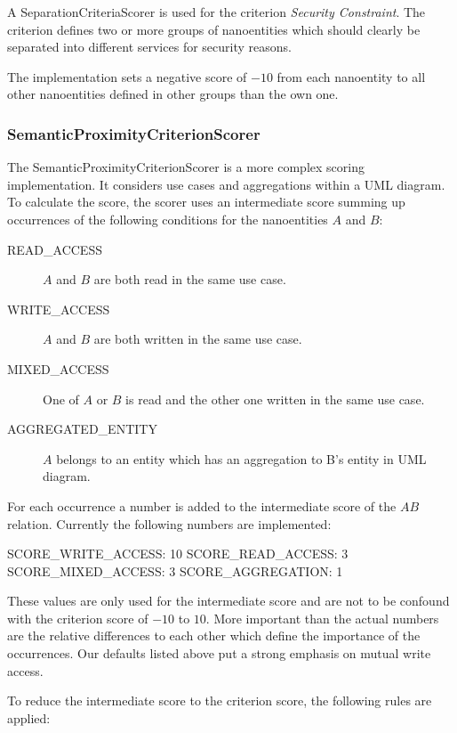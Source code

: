 A SeparationCriteriaScorer is used for the criterion \textit{Security Constraint}. The criterion defines two or more groups of nanoentities which should clearly be separated into different services for security reasons. 

The implementation sets a negative score of $-10$ from each nanoentity to all other nanoentities defined in other groups than the own one. 

\subsubsection{SemanticProximityCriterionScorer}

The SemanticProximityCriterionScorer is a more complex scoring implementation. It considers use cases and aggregations within a UML diagram. To calculate the score, the scorer uses an intermediate score summing up occurrences of the following conditions for the nanoentities $A$ and $B$:

\begin{description}
	\item [READ\_ACCESS] $A$ and $B$ are both read in the same use case.
	\item [WRITE\_ACCESS] $A$ and $B$ are both written in the same use case.
	\item [MIXED\_ACCESS] One of $A$ or $B$ is read and the other one written in the same use case.
	\item [AGGREGATED\_ENTITY] $A$ belongs to an entity which has an aggregation to B's entity in UML diagram. 
\end{description}

For each occurrence a number is added to the intermediate score of the $AB$ relation. Currently the following numbers are implemented:

SCORE\_WRITE\_ACCESS: 10 \newline
SCORE\_READ\_ACCESS: 3  \newline
SCORE\_MIXED\_ACCESS: 3 \newline 
SCORE\_AGGREGATION: 1 \newline 

These values are only used for the intermediate score and are not to be confound with the criterion score of $-10$ to $10$. More important than the actual numbers are the relative differences to each other which define the importance of the occurrences. Our defaults listed above put a strong emphasis on mutual write access. 

To reduce the intermediate score to the criterion score, the following rules are applied:

